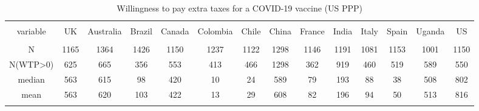 
\begin{table}[!htbp] \centering 
  \caption{Willingness to pay extra taxes for a COVID-19 vaccine (US PPP)} 
  \label{} 
\begin{tabular}{@{\extracolsep{5pt}} cccccccccccccc} 
\\[-1.8ex]\hline 
\hline \\[-1.8ex] 
variable & UK & Australia & Brazil & Canada & Colombia & Chile & China & France & India & Italy & Spain & Uganda & US \\ 
\hline \\[-1.8ex] 
N & 1165 & 1364 & 1426 & 1150 & 1237 & 1122 & 1298 & 1146 & 1191 & 1081 & 1153 & 1001 & 1150 \\ 
N(WTP\textgreater 0) & 625 & 665 & 356 & 553 & 413 & 466 & 1298 & 362 & 919 & 460 & 519 & 589 & 550 \\ 
median & 563 & 615 & 98 & 420 & 10 & 24 & 589 & 79 & 193 & 88 & 38 & 508 & 802 \\ 
mean & 563 & 620 & 103 & 422 & 13 & 29 & 608 & 82 & 196 & 94 & 50 & 513 & 816 \\ 
\hline \\[-1.8ex] 
\end{tabular} 
\end{table} 
